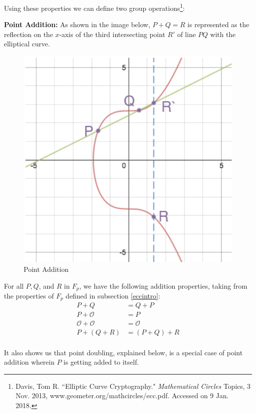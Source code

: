 \documentclass[a4paper,12pt]{article}
\theoremstyle{definition}
\begin{document}
Using these properties we can define two group operations\footnote{Davis, Tom R. ``Elliptic Curve Cryptography." \textit{Mathematical Circles} Topics, 3 Nov. 2013, www.geometer.org/mathcircles/ecc.pdf. Accessed on 9 Jan. 2018.}:

\textbf{Point Addition:}  As shown in the image below, $P + Q = R$ is represented as the reflection on the $x$-axis of the third intersecting point $R'$ of line $PQ$ with the elliptical curve.
\begin{figure}[H] \label{pointadditionimage}
	 \centering
     \includegraphics[width=.5\linewidth]{pointaddition}
     \caption{Point Addition}
     \label{}	
\end{figure}

For all $P, Q$, and $R$ in $F_p$, we have the following addition properties, taking from the properties of $F_p$ defined in subsection \ref{eccintro}:
\begin{equation*}
\begin{split}
	P+Q &= Q+P \\
	P+ \mathcal{O} &=P \\
	\mathcal{O} + \mathcal{O} &= \mathcal{O} \\
	P+ (Q+R) &= (P+Q)+R \\
\end{split}	
\end{equation*}

It also shows us that point doubling, explained below, is a special case of point addition wherein $P$ is getting added to itself.
\end{document}
